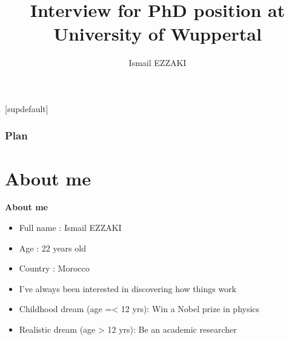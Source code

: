 \documentclass[11pt,aspectratio=169]{beamer}
\title[ \hspace{0.8cm} \insertframenumber/\inserttotalframenumber]{{\sc Interview for PhD position at University of Wuppertal}}
\author{{ Ismail EZZAKI}}
\begin{document}
	
	[supdefault]

{
  \begin{frame}
   \begin{center}	%
  \end{center}
  
    \titlepage
  \end{frame}
}
\begin{frame}

  \frametitle{Plan
  }
	\tableofcontents
\end{frame}





\section{About me}
 
\begin{frame}{\underline{\secname}}
	
\begin{center}
\textbf{About me}
\end{center}

\begin{itemize}
	\item Full name : Ismail EZZAKI
	\item Age : 22 years old
	\item Country : Morocco
	\item I’ve always been interested in discovering how things work
	\item Childhood dream (age =< 12 yrs): Win a Nobel prize in physics
	\item Realistic dream (age > 12 yrs): Be an academic researcher
\end{itemize}	


\end{frame}
\end{document}
